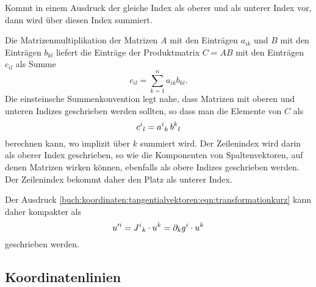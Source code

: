\begin{definition}
Kommt in einem Ausdruck der gleiche Index als oberer und als unterer
Index vor, dann wird über diesen Index summiert.
\end{definition}

Die Matrizenmultiplikation der Matrizen $A$ mit den Einträgen $a_{ik}$ und
$B$ mit den Einträgen $b_{kl}$ liefert die Einträge der Produktmatrix
$C=AB$ mit den Einträgen $c_{il}$ als Summe
\[
c_{il}
=
\sum_{k=1}^n
a_{ik} b_{kl}.
\]
Die einsteinsche Summenkonvention legt nahe, dass Matrizen mit oberen
und unteren Indizes geschrieben werden sollten, so dass man die
Elemente von $C$ als
\[
c^i\mathstrut_l
=
a^i\mathstrut_k\,
b^k\mathstrut_l
\]
berechnen kann, wo implizit über $k$ summiert wird.
Der Zeilenindex wird darin als oberer Index geschrieben, so wie
die Komponenten von Spaltenvektoren, auf denen Matrizen wirken können, 
ebenfalls als obere Indizes geschrieben werden.
Der Zeilenindex bekommt daher den Platz als unterer Index.

Der Ausdruck
\eqref{buch:koordinaten:tangentialvektoren:eqn:transformationkurz}
kann daher kompakter als
\[
u^{\prime i}
=
J^i\mathstrut_k \cdot u^k
=
\partial_kg^i\cdot u^k
\]
geschrieben werden.

%
%
\subsection{Koordinatenlinien}



